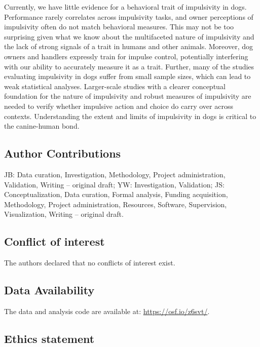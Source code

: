 \documentclass[
  ,pub,floatsintext]{apa6}
\begin{document}
Currently, we have little evidence for a behavioral trait of impulsivity in dogs. Performance rarely correlates across impulsivity tasks, and owner perceptions of impulsivity often do not match behavioral measures. This may not be too surprising given what we know about the multifaceted nature of impulsivity and the lack of strong signals of a trait in humans and other animals. Moreover, dog owners and handlers expressly train for impulse control, potentially interfering with our ability to accurately measure it as a trait. Further, many of the studies evaluating impulsivity in dogs suffer from small sample sizes, which can lead to weak statistical analyses. Larger-scale studies with a clearer conceptual foundation for the nature of impulsivity and robust measures of impulsivity are needed to verify whether impulsive action and choice do carry over across contexts. Understanding the extent and limits of impulsivity in dogs is critical to the canine-human bond.

\hypertarget{author-contributions}{%
\subsection{Author Contributions}\label{author-contributions}}

JB: Data curation, Investigation, Methodology, Project administration, Validation, Writing -- original draft; YW: Investigation, Validation; JS: Conceptualization, Data curation, Formal analysis, Funding acquisition, Methodology, Project administration, Resources, Software, Supervision, Visualization, Writing -- original draft.

\hypertarget{conflict-of-interest}{%
\subsection{Conflict of interest}\label{conflict-of-interest}}

The authors declared that no conflicts of interest exist.

\hypertarget{data-availability}{%
\subsection{Data Availability}\label{data-availability}}

The data and analysis code are available at: \url{https://osf.io/z6svt/}.

\hypertarget{ethics-statement}{%
\subsection{Ethics statement}\label{ethics-statement}}
\end{document}
